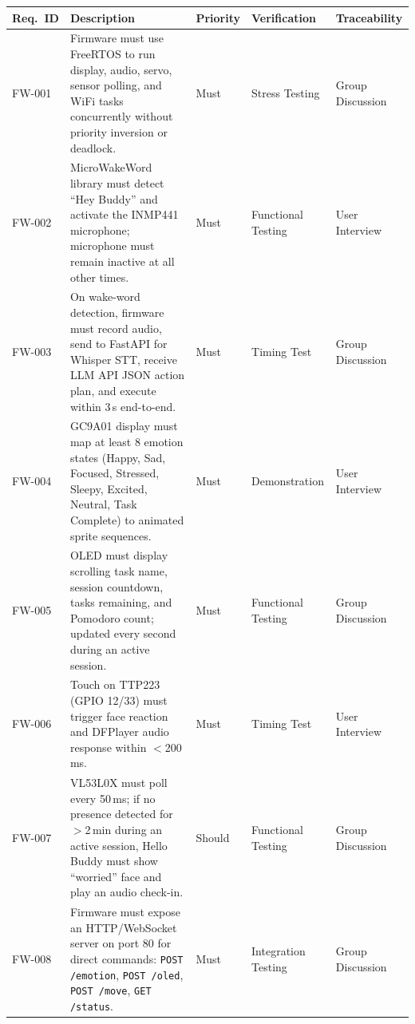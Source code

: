 \documentclass[12pt,a4paper]{article}
\begin{document}
\begin{center}
\scriptsize
\begin{tabular}{|L{0.07\textwidth}|L{0.35\textwidth}|L{0.10\textwidth}|L{0.18\textwidth}|L{0.18\textwidth}|}
\hline
\textbf{Req.~ID} & \textbf{Description} & \textbf{Priority} &
\textbf{Verification} & \textbf{Traceability} \\ \hline
FW-001 &
Firmware must use FreeRTOS to run display, audio, servo, sensor
polling, and WiFi tasks concurrently without priority inversion
or deadlock. &
Must &
Stress Testing &
Group Discussion \\ \hline
FW-002 &
MicroWakeWord library must detect ``Hey Buddy'' and activate the
INMP441 microphone; microphone must remain inactive at all other
times. &
Must &
Functional Testing &
User Interview \\ \hline
FW-003 &
On wake-word detection, firmware must record audio, send to
FastAPI for Whisper STT, receive LLM API JSON action plan, and
execute within 3\,s end-to-end. &
Must &
Timing Test &
Group Discussion \\ \hline
FW-004 &
GC9A01 display must map at least 8 emotion states (Happy, Sad,
Focused, Stressed, Sleepy, Excited, Neutral, Task Complete) to
animated sprite sequences. &
Must &
Demonstration &
User Interview \\ \hline
FW-005 &
OLED must display scrolling task name, session countdown, tasks
remaining, and Pomodoro count; updated every second during an
active session. &
Must &
Functional Testing &
Group Discussion \\ \hline
FW-006 &
Touch on TTP223 (GPIO 12/33) must trigger face reaction and
DFPlayer audio response within $<$200\,ms. &
Must &
Timing Test &
User Interview \\ \hline
FW-007 &
VL53L0X must poll every 50\,ms; if no presence detected for
$>$2\,min during an active session, Hello Buddy must show
``worried'' face and play an audio check-in. &
Should &
Functional Testing &
Group Discussion \\ \hline
FW-008 &
Firmware must expose an HTTP/WebSocket server on port 80 for
direct commands: \texttt{POST /emotion}, \texttt{POST /oled},
\texttt{POST /move}, \texttt{GET /status}. &
Must &
Integration Testing &
Group Discussion \\ \hline
\end{tabular}
\end{center}

\newpage
\end{document}
